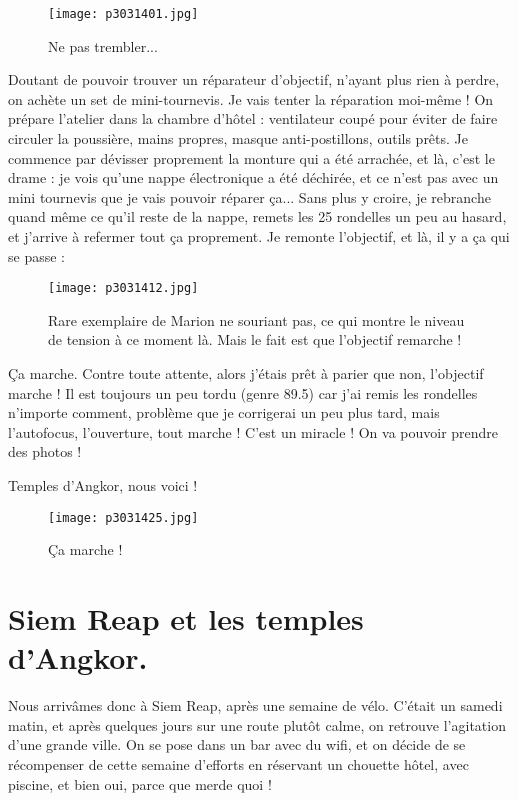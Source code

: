 \documentclass{book}
\begin{document}
\begin{figure}[h]
\centering
\texttt{[image: p3031401.jpg]}
\caption*{Ne pas trembler...}
\end{figure}

Doutant de pouvoir trouver un réparateur d'objectif, n'ayant plus rien à perdre, on achète un set de mini-tournevis. Je vais tenter la réparation moi-même ! On prépare l'atelier dans la chambre d’hôtel : ventilateur coupé pour éviter de faire circuler la poussière, mains propres, masque anti-postillons, outils prêts. Je commence par dévisser proprement la monture qui a été arrachée, et là, c'est le drame : je vois qu'une nappe électronique a été déchirée, et ce n'est pas avec un mini tournevis que je vais pouvoir réparer ça... Sans plus y croire, je rebranche quand même ce qu'il reste de la nappe, remets les 25 rondelles un peu au hasard, et j'arrive à refermer tout ça proprement. Je remonte l'objectif, et là, il y a ça qui se passe :


\begin{figure}[h]
\centering
\texttt{[image: p3031412.jpg]}
\caption*{Rare exemplaire de Marion ne souriant pas, ce qui montre le niveau de tension à ce moment là. Mais le fait est que l'objectif remarche !}
\end{figure}

Ça marche. Contre toute attente, alors j'étais prêt à parier que non, l'objectif marche ! Il est toujours un peu tordu (genre 89.5\textdegree ) car j'ai remis les rondelles n'importe comment, problème que je corrigerai un peu plus tard, mais l'autofocus, l'ouverture, tout marche ! C'est un miracle ! On va pouvoir prendre des photos !

Temples d'Angkor, nous voici !


\begin{figure}[h]
\centering
\texttt{[image: p3031425.jpg]}
\caption*{Ça marche !}
\end{figure}



\chapter{Siem Reap et les temples d'Angkor.}
Nous arrivâmes donc à Siem Reap, après une semaine de vélo. C'était un samedi matin, et après quelques jours sur une route plutôt calme, on retrouve l'agitation d'une grande ville. On se pose dans un bar avec du wifi, et on décide de se récompenser de cette semaine d'efforts en réservant un chouette hôtel, avec piscine, et bien oui,  parce que merde quoi !
\end{document}
